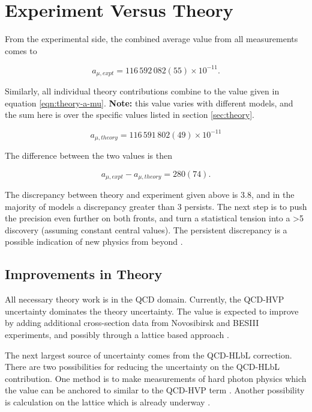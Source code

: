 \section{Experiment Versus Theory} \label{sec:tension}

From the experimental side, the combined average value from all measurements comes to 

\begin{equation}
\label{eqn:expt-a-mu}
a_{\mu,expt} = 116\,592\,082 (55) \times 10^{-11}.
\end{equation}

\noindent
Similarly, all individual theory contributions combine to the value given in equation \ref{eqn:theory-a-mu}.  \textbf{Note:} this value varies with different models, and the sum here is over the specific values listed in section \ref{sec:theory}.

\begin{equation}
\label{eqn:theory-a-mu}
a_{\mu,theory} = 116\,591\,802 (49) \times 10^{-11}
\end{equation}

\noindent
The difference between the two values is then

\begin{equation}
\label{eqn:diff-a-mu}
a_{\mu,expt} - a_{\mu,theory} = 280 (74).
\end{equation}

The discrepancy between theory and experiment given above is \SI{3.8}{\sigma}, and in the majority of models a discrepancy greater than \SI{3}{\sigma} persists.  The next step is to push the precision even further on both fronts, and turn a statistical tension into a \SI{>5}{\sigma} discovery (assuming constant central values).  The persistent discrepancy is a possible indication of new physics from beyond \tsm.

\subsection{Improvements in Theory}

All necessary theory work is in the QCD domain.  Currently, the QCD-HVP uncertainty dominates the theory uncertainty.  The value is expected to improve by adding additional cross-section data from Novosibirsk and BESIII experiments, and possibly through a lattice based approach \cite{muon-g-2-blum}.  

The next largest source of uncertainty comes from the QCD-HLbL correction.  There are two possibilities for reducing the uncertainty on the QCD-HLbL contribution.  One method is to make measurements of hard photon physics which the value can be anchored to similar to the QCD-HVP term \cite{muon-g-2-blum}.  Another possibility is calculation on the lattice which is already underway \cite{qcd-hlbl-blum-2016, qcd-hlbl-blum-2017}.  

